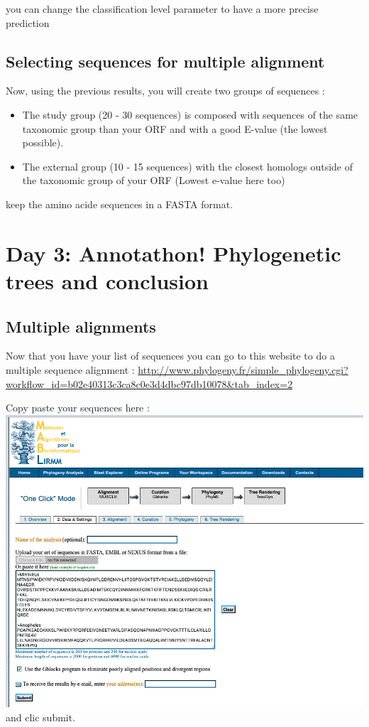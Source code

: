 \documentclass[
]{book}
\begin{document}
you can change the classification level parameter to have a more precise prediction

\hypertarget{selecting-sequences-for-multiple-alignment}{%
\subsection{Selecting sequences for multiple alignment}\label{selecting-sequences-for-multiple-alignment}}

Now, using the previous results, you will create two groups of sequences :

\begin{itemize}
\item
  The study group (20 - 30 sequences) is composed with sequences of the same taxonomic group than your ORF and with a good E-value (the lowest possible).
\item
  The external group (10 - 15 sequences) with the closest homologs outside of the taxonomic group of your ORF (Lowest e-value here too)
\end{itemize}

keep the amino acide sequences in a FASTA format.

\hypertarget{day-3-annotathon-phylogenetic-trees-and-conclusion}{%
\section{Day 3: Annotathon! Phylogenetic trees and conclusion}\label{day-3-annotathon-phylogenetic-trees-and-conclusion}}

\hypertarget{multiple-alignments}{%
\subsection{Multiple alignments}\label{multiple-alignments}}

Now that you have your list of sequences you can go to this website to do a multiple sequence alignment : \url{http://www.phylogeny.fr/simple_phylogeny.cgi?workflow_id=b02e40313c3ca8c0e3d4dbc97db10078\&tab_index=2}

Copy paste your sequences here :
\includegraphics{figures/Annotathon/Anno_Multiple_sequence_alignment.png}
and clic submit.
\end{document}
